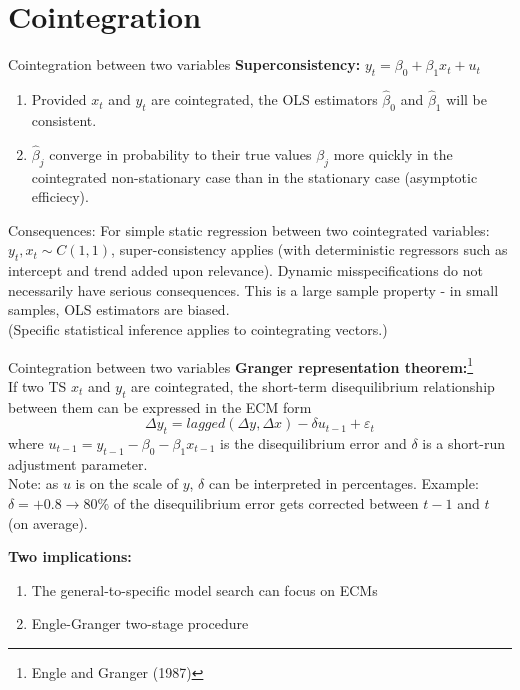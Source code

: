 \documentclass{beamer}
\begin{document}

\section{Cointegration}

\begin{frame}{Cointegration between two variables}
\textbf{Superconsistency:} $y_t =  \beta_0 + \beta_1 x_t + u_t$\\
\begin{enumerate}
\item Provided $x_t$ and $y_t$ are cointegrated, the OLS estimators $\hat{\beta}_0$ and $\hat{\beta}_1$ will be consistent. 
\item $\hat{\beta}_j$ converge in probability to their true values $\beta_j$ more quickly in the cointegrated non-stationary case than in the stationary case (asymptotic efficiecy).
\end{enumerate}
\begin{block}{Consequences:}
For simple static regression between two cointegrated variables: $y_t, x_t \sim C(1,1)$, super-consistency applies (with deterministic regressors such as intercept and trend added upon relevance). Dynamic misspecifications do not necessarily have serious consequences. This is a large sample property - in small samples, OLS estimators are biased.\\ (Specific statistical inference applies to cointegrating vectors.)
\end{block}
\end{frame}


\begin{frame}{Cointegration between two variables}
\textbf{Granger representation theorem:}\footnote{Engle and Granger (1987)}\\
If two TS $x_t$ and $y_t$ are cointegrated, the short-term disequilibrium relationship between them can be expressed in the ECM form
\vspace{-0.2cm}
\begin{equation} \label{eq6}
 \Delta y_t = lagged(\Delta y, \Delta x) - \delta u_{t-1} + \varepsilon_t 
\end{equation}
where $u_{t-1} = y_{t-1} - \beta_0 - \beta_1 x_{t-1}$ is the disequilibrium error and $\delta$ is a short-run adjustment parameter. \\
\footnotesize{Note: as $u$ is on the scale of $y$, $\delta$ can be interpreted in percentages. Example: $\delta = +0.8 \rightarrow 80 \%$ of the disequilibrium error gets corrected between $t-1$ and $t$ (on average).}
\vspace{0.1cm}

\textbf{Two implications:}
\begin{enumerate}
\item The general-to-specific model search can focus on ECMs
\item Engle-Granger two-stage procedure
\end{enumerate}
\end{frame}
\end{document}
